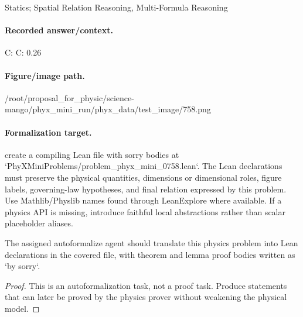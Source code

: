 Statics; Spatial Relation Reasoning, Multi-Formula Reasoning

\paragraph{Recorded answer/context.}
C: C: 0.26

\paragraph{Figure/image path.}
/root/proposal\_for\_physic/science-mango/phyx\_mini\_run/phyx\_data/test\_image/758.png

\paragraph{Formalization target.}
create a compiling Lean file with sorry bodies at `PhyXMiniProblems/problem\_phyx\_mini\_0758.lean`. The Lean declarations must preserve the physical quantities, dimensions or dimensional roles, figure labels, governing-law hypotheses, and final relation expressed by this problem.
Use Mathlib/Physlib names found through LeanExplore where available. If a physics API is missing, introduce faithful local abstractions rather than scalar placeholder aliases.

\begin{theorem}
\label{thm:physics:phyx_mini_0758:target}
The assigned autoformalize agent should translate this physics problem into Lean declarations in the covered file, with theorem and lemma proof bodies written as `by sorry`.
\end{theorem}
\begin{proof}
This is an autoformalization task, not a proof task. Produce statements that can later be proved by the physics prover without weakening the physical model.
\end{proof}

